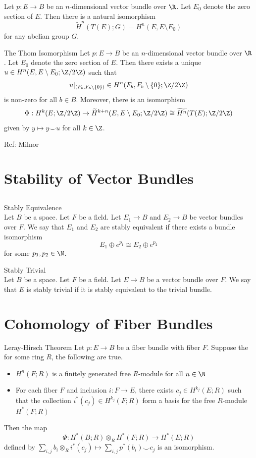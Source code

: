 \documentclass[a4paper]{article}
\begin{document}
\begin{lmm}{}{} Let $p:E\to B$ be an $n$-dimensional vector bundle over $\R$. Let $E_0$ denote the zero section of $E$. Then there is a natural isomorphism $$\widetilde{H}^n(T(E);G)=H^n(E,E\setminus E_0)$$ for any abelian group $G$. 
\end{lmm}

\begin{thm}{The Thom Isomorphism}{} Let $p:E\to B$ be an $n$-dimensional vector bundle over $\R$. Let $E_0$ denote the zero section of $E$. Then there exists a unique $u\in H^n(E,E\setminus E_0;\Z/2\Z)$ such that $$u|_{(F_b,F_b\setminus\{0\})}\in H^n(F_b,F_b\setminus\{0\};\Z/2\Z)$$ is non-zero for all $b\in B$. Moreover, there is an isomorphism $$\Phi:H^k(E;\Z/2\Z)\to\widetilde{H}^{k+n}(E,E\setminus E_0;\Z/2\Z)\cong\widetilde{H^n}(T(E);\Z/2\Z)$$ given by $y\mapsto y\smile u$ for all $k\in\Z$. 
\end{thm}

Ref: Milnor

\pagebreak
\section{Stability of Vector Bundles}
\subsection{}
\begin{defn}{Stably Equivalence}{}\\
Let $B$ be a space. Let $F$ be a field. Let $E_1\to B$ and $E_2\to B$ be vector bundles over $F$. We say that $E_1$ and $E_2$ are stably equivalent if there exists a bundle isomorphism $$E_1\oplus e^{p_1}\cong E_2\oplus e^{p_2}$$ for some $p_1,p_2\in\N$. 
\end{defn}

\begin{defn}{Stably Trivial}{}\\
Let $B$ be a space. Let $F$ be a field. Let $E\to B$ be a vector bundle over $F$. We say that $E$ is stably trivial if it is stably equivalent to the trivial bundle. 
\end{defn}


\pagebreak
\section{Cohomology of Fiber Bundles}

\begin{thm}{Leray-Hirsch Theorem}{} Let $p:E\to B$ be a fiber bundle with fiber $F$. Suppose the for some ring $R$, the following are true. 
\begin{itemize}
\item $H^n(F;R)$ is a finitely generated free $R$-module for all $n\in\N$
\item For each fiber $F$ and inclusion $i:F\to E$, there exists $c_j\in H^{k_j}(E;R)$ such that the collection $i^\ast(c_j)\in H^{k_j}(F;R)$ form a basis for the free $R$-module $H^\ast(F;R)$
\end{itemize}
Then the map $$\Phi:H^\ast(B;R)\otimes_R H^\ast(F;R)\to H^\ast(E;R)$$ defined by $\sum_{i,j}b_i\otimes_R i^\ast(c_j)\mapsto\sum_{i,j} p^\ast(b_i)\smile c_j$ is an isomorphism. 
\end{thm}
\end{document}
